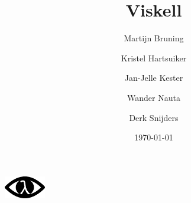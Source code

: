 \documentclass[twoside,openright]{report}
\title{Viskell}
\author{
     Martijn Bruning
\and Kristel Hartsuiker
\and Jan-Jelle Kester
\and Wander Nauta
\and Derk Snijders
}
\date{\today}
\begin{document}
\newcommand{\code}[1]{\texttt{#1}}

\renewcommand*\rmdefault{ppl}
\renewcommand*\sfdefault{ppl}

\begin{titlepage}
    {\Huge \thetitle} \hfill \includegraphics[height=1cm]{Images/eye} \\
    \vfill
    \begin{center}
    \end{center}
    \vfill
    \theauthor \\
    \thedate
\end{titlepage}

\tableofcontents



















\printindex

\printglossaries




\begin{appendices}

\end{appendices}
\end{document}
